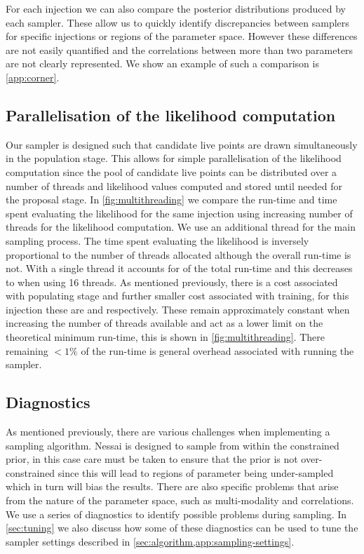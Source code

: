 \documentclass[%
 reprint,
nofootinbib,
 amsmath,amssymb,
 aps,
 prd,
]{revtex4-2}
\newcommand{\nessai}{{\sc Nessai}\xspace}
\begin{document}
For each injection we can also compare the posterior distributions produced by each sampler. These allow us to quickly identify discrepancies between samplers for specific injections or regions of the parameter space. However these differences are not easily quantified and the correlations between more than two parameters are not clearly represented. We show an example of such a comparison is \cref{app:corner}.

\subsection{Parallelisation of the likelihood computation}\label{sec:multiprocessing}

Our sampler is designed such that candidate live points are drawn simultaneously in the population stage. This allows for simple parallelisation of the likelihood computation since the pool of candidate live points can be distributed over a number of threads and likelihood values computed and stored until needed for the proposal stage. In \cref{fig:multithreading} we compare the run-time and time spent evaluating the likelihood for the same injection using increasing number of threads for the likelihood computation. We use an additional thread for the main sampling process. The time spent evaluating the likelihood is inversely proportional to the number of threads allocated although the overall run-time is not. With a single thread it accounts for \multievaltime of the total run-time and this decreases to \multievaltimemin when using 16 threads. As mentioned previously, there is a cost associated with populating stage and further smaller cost associated with training, for this injection these are \multipoptime and \multitraintime respectively. These remain approximately constant when increasing the number of threads available and act as a lower limit on the theoretical minimum run-time, this is shown in \cref{fig:multithreading}. There remaining $<1\%$ of the run-time is general overhead associated with running the sampler.

\subsection{Diagnostics}\label{sec:diagnostics}

As mentioned previously, there are various challenges when implementing a sampling algorithm. \nessai is designed to sample from within the constrained prior, in this case care must be taken to ensure that the prior is not over-constrained since this will lead to regions of parameter being under-sampled which in turn will bias the results. There are also specific problems that arise from the nature of the parameter space, such as multi-modality and correlations. We use a series of diagnostics to identify possible problems during sampling. In \cref{sec:tuning} we also discuss how some of these diagnostics can be used to tune the sampler settings described in \cref{sec:algorithm,app:sampling-settings}.
\end{document}
